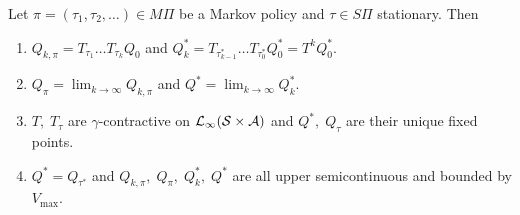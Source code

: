\begin{prop}
  Let $\pi = (\tau_1, \tau_2, \dots) \in M\Pi$ be a Markov policy
  and $\tau \in S\Pi$ stationary. Then
  \leavevmode
  \begin{enumerate}
    \item $Q_{k, \pi} = T_{\tau_1} \dots T_{\tau_k} Q_0$ and
      $Q^*_k = T_{\tau_{k-1}^*} \dots T_{\tau_0^*} Q^*_0
      = T^k Q^*_0$.
    \item $Q_\pi = \lim_{k \to \infty} Q_{k, \pi}$ and
      $Q^* = \lim_{k\to\infty} Q_k^*$. 
    \item $T,\; T_\tau$ are $\gamma$-contractive on
      $\mathcal{L}_\infty(\mathcal{S}\times\mathcal{A})$
      and $Q^*,\; Q_\tau$ are their unique fixed points.
    \item $Q^* = Q_{\tau^*}$ and
      $Q_{k, \pi},\; Q_\pi,\; Q^*_k,\; Q^*$ are all upper semicontinuous
      and bounded by $V_{\max}$.
  \end{enumerate}
  \label{prop:propQ}
\end{prop}


